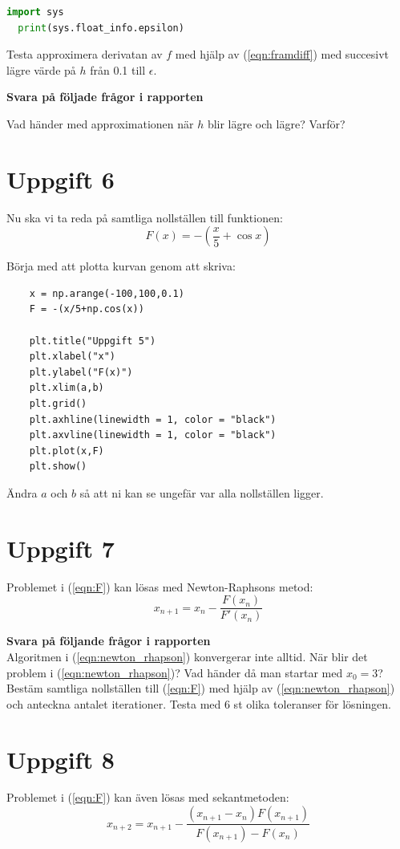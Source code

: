 \documentclass[a4paper]{article}
\begin{document}
\begin{lstlisting}[language=Python]
  import sys
  print(sys.float_info.epsilon)
\end{lstlisting}

Testa approximera derivatan av \(f\) med hjälp av (\ref{eqn:framdiff}) med succesivt lägre värde på \(h\) från 0.1
till \(\epsilon\).

\textbf{Svara på följade frågor i rapporten}

Vad händer med approximationen när \(h\) blir lägre och lägre? Varför?


\newpage
\section{Uppgift 6}
Nu ska vi ta reda på samtliga nollställen till funktionen:
\begin{equation} \label{eqn:F}
  F(x)=-\left(\frac{x}{5}+\cos x\right)
\end{equation}

Börja med att plotta kurvan genom att skriva:
\begin{lstlisting}
    x = np.arange(-100,100,0.1)
    F = -(x/5+np.cos(x))

    plt.title("Uppgift 5") 
    plt.xlabel("x") 
    plt.ylabel("F(x)") 
    plt.xlim(a,b) 
    plt.grid()
    plt.axhline(linewidth = 1, color = "black")
    plt.axvline(linewidth = 1, color = "black")
    plt.plot(x,F)
    plt.show()
\end{lstlisting}
Ändra \( a  \) och \( b  \) så att ni kan se ungefär var alla nollställen ligger.


\section{Uppgift 7}
Problemet i (\ref{eqn:F}) kan lösas med Newton-Raphsons metod:
\begin{equation} \label{eqn:newton_rhapson}
  x_{n+1}=x_n-\frac{F(x_n)}{F'(x_n)}
\end{equation}


\textbf{Svara på följande frågor i rapporten}\\
Algoritmen i (\ref{eqn:newton_rhapson}) konvergerar inte alltid. När blir det problem i (\ref{eqn:newton_rhapson})?
Vad händer då man startar med \( x_0 = 3  \)? Bestäm samtliga nollställen
till (\ref{eqn:F}) med hjälp av (\ref{eqn:newton_rhapson}) och anteckna antalet
iterationer. Testa med 6 st olika toleranser för lösningen.


\section{Uppgift 8}
Problemet i (\ref{eqn:F}) kan även lösas med sekantmetoden:
\begin{equation} \label{eqn:sekantmetoden}
  x_{n+2}=x_{n+1}-\frac{(x_{n+1}-x_n)F(x_{n+1})}{F(x_{n+1})-F(x_n)}
\end{equation}
\end{document}
